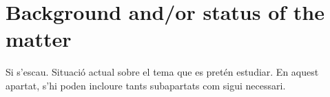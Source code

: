 \chapter{Background and/or status of the matter}

Si s’escau. Situació actual sobre el tema que es pretén estudiar. En aquest apartat, s’hi poden incloure tants subapartats com sigui necessari.